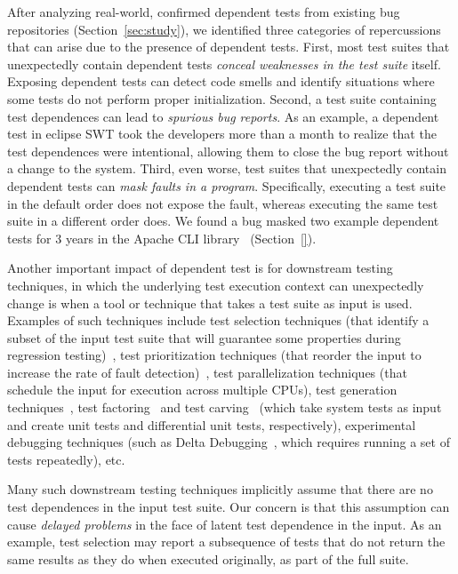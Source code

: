 After analyzing  real-world, confirmed dependent
tests from existing bug repositories (Section~\ref{sec:study}), we identified three
categories of repercussions that can arise due to the presence of dependent tests.
First, most test suites that unexpectedly contain dependent tests \emph{conceal
weaknesses in the test suite} itself. Exposing
dependent tests can detect code smells and identify situations
where some tests do not perform proper initialization.
Second, a test suite containing test dependences can lead
to \emph{spurious bug reports}. As an example, a dependent test in
eclipse SWT took the developers
more than a month to realize that the test dependences were intentional,
allowing them to close the bug report without a change to the system.
Third, even worse, test suites that unexpectedly contain dependent tests can
\emph{mask faults in a program}. Specifically, executing a test suite in the
default order does not expose the fault, whereas
executing the same test suite in a different order does. We found 
a bug masked two example dependent tests
for 3 years in the Apache CLI library~\cite{cli} (Section~\ref{}).


Another important impact of dependent test is for downstream testing
techniques, in which the underlying test execution context can
unexpectedly change is when a tool or technique that takes a test
suite as input is used.  Examples of such techniques include
test selection techniques (that identify a subset of
the input test suite that will guarantee some properties during
regression testing)~\cite{harroldetal:OOPSLA:2001},
test prioritization techniques (that reorder the
input to increase the rate of fault detection)~\cite{Elbaum:2000:PTC:347324.348910},
test parallelization techniques (that schedule the input for execution across multiple
CPUs), test generation techniques~\cite{PachecoLET2007, SPLAT},
test factoring~\cite{Saff:2005} and test carving~\cite{Elbaum:2006} (which take system tests as
input and create unit tests and differential unit tests,
respectively), experimental debugging techniques (such as Delta Debugging~\cite{Zeller:2002},
which requires running a set of tests repeatedly), etc. 

Many such downstream testing techniques implicitly assume that
there are no test dependences in the input test suite.  Our concern is
that this assumption can cause \emph{delayed problems} in the face
of latent test dependence in the input.  As an
example, test selection may report a subsequence of tests that do not
return the same results as they do when executed originally, as part of the full suite.

